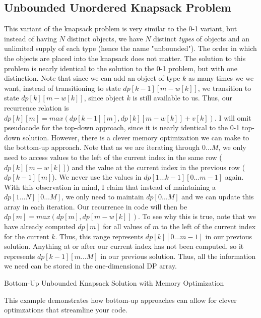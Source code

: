 \documentclass{article}
\newcommand{\nl}[]{\newline}
\begin{document}
\subsection{Unbounded Unordered Knapsack Problem}
This variant of the knapsack problem is very similar to the 0-1 variant, but instead of having $N$ distinct objects, we have $N$ distinct \emph{types} of objects and an unlimited supply of each type (hence the name "unbounded"). The order in which the objects are placed into the knapsack does not matter.\nl\nl
The solution to this problem is nearly identical to the solution to the 0-1 problem, but with one distinction. Note that since we can add an object of type $k$ as many times we we want, instead of transitioning to state $dp[k-1][m-w[k]]$, we transition to state $dp[k][m-w[k]]$, since object $k$ is still available to us. Thus, our recurrence relation is $dp[k][m] = max(dp[k-1][m], dp[k][m-w[k]]+v[k])$.\nl\nl
I will omit pseudocode for the top-down approach, since it is nearly identical to the 0-1 top-down solution. However, there is a clever memory optimization we can make to the bottom-up approach. Note that as we are iterating through $0\ldots M$, we only need to access values to the left of the current index in the same row ($dp[k][m-w[k]]$) and the value at the current index in the previous row ($dp[k-1][m]$). We never use the values in $dp[1\ldots k-1][0\ldots m-1]$ again. With this observation in mind, I claim that instead of maintaining a $dp[1\ldots N][0\ldots M]$, we only need to maintain $dp[0\ldots M]$ and we can update this array in each iteration. Our recurrence in code will then be $dp[m] = max(dp[m], dp[m-w[k]])$. To see why this is true, note that we have already computed $dp[m]$ for all values of $m$ to the left of the current index for the current $k$. Thus, this range represents $dp[k][0\ldots m-1]$ in our previous solution. Anything at or after our current index has not been computed, so it represents $dp[k-1][m\ldots M]$ in our previous solution. Thus, all the information we need can be stored in the one-dimensional DP array.
\begin{algorithm}
\caption{Bottom-Up Unbounded Knapsack Solution with Memory Optimization}
\begin{algorithmic}
 
        \EndIf
    \EndFor
\EndFo
\end{algorithmic}
\end{algorithm}
\nl\nl\nl\noindent This example demonstrates how bottom-up approaches can allow for clever optimzations that streamline your code.
\end{document}
